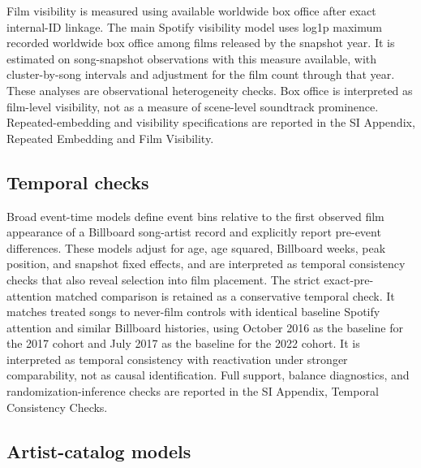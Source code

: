 \documentclass[10pt]{article}
\begin{document}
Film visibility is measured using available worldwide box office after exact internal-ID linkage. The main Spotify visibility model uses log1p maximum recorded worldwide box office among films released by the snapshot year. It is estimated on song-snapshot observations with this measure available, with cluster-by-song intervals and adjustment for the film count through that year. These analyses are observational heterogeneity checks. Box office is interpreted as film-level visibility, not as a measure of scene-level soundtrack prominence. Repeated-embedding and visibility specifications are reported in the SI Appendix, Repeated Embedding and Film Visibility.

\subsection*{Temporal checks}

Broad event-time models define event bins relative to the first observed film appearance of a Billboard song-artist record and explicitly report pre-event differences. These models adjust for age, age squared, Billboard weeks, peak position, and snapshot fixed effects, and are interpreted as temporal consistency checks that also reveal selection into film placement. The strict exact-pre-attention matched comparison is retained as a conservative temporal check. It matches treated songs to never-film controls with identical baseline Spotify attention and similar Billboard histories, using October 2016 as the baseline for the 2017 cohort and July 2017 as the baseline for the 2022 cohort. It is interpreted as temporal consistency with reactivation under stronger comparability, not as causal identification. Full support, balance diagnostics, and randomization-inference checks are reported in the SI Appendix, Temporal Consistency Checks.

\subsection*{Artist-catalog models}
\end{document}

